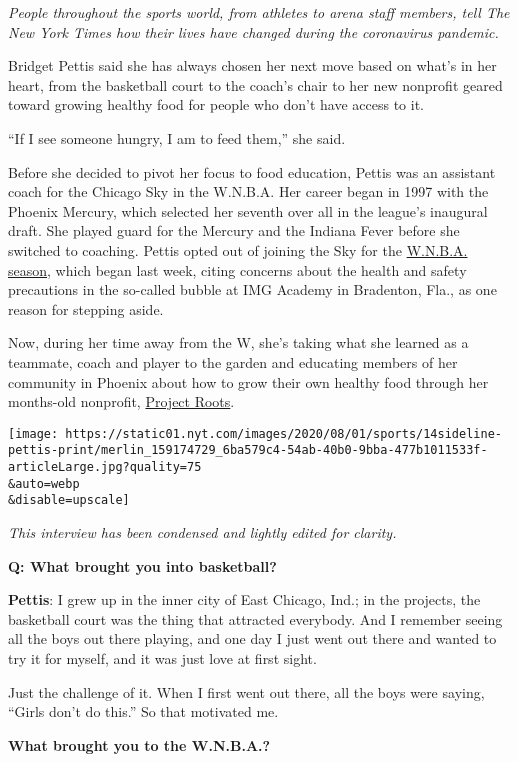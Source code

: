 \emph{People throughout the sports world, from athletes to arena staff
members, tell The New York Times how their lives have changed during the
coronavirus pandemic.}

Bridget Pettis said she has always chosen her next move based on what's
in her heart, from the basketball court to the coach's chair to her new
nonprofit geared toward growing healthy food for people who don't have
access to it.

``If I see someone hungry, I am to feed them,'' she said.

Before she decided to pivot her focus to food education, Pettis was an
assistant coach for the Chicago Sky in the W.N.B.A. Her career began in
1997 with the Phoenix Mercury, which selected her seventh over all in
the league's inaugural draft. She played guard for the Mercury and the
Indiana Fever before she switched to coaching. Pettis opted out of
joining the Sky for the
\href{https://www.nytimes.com/2020/07/23/sports/basketball/wnba-season-preview.html}{W.N.B.A.
season}, which began last week, citing concerns about the health and
safety precautions in the so-called bubble at IMG Academy in Bradenton,
Fla., as one reason for stepping aside.

Now, during her time away from the W, she's taking what she learned as a
teammate, coach and player to the garden and educating members of her
community in Phoenix about how to grow their own healthy food through
her months-old nonprofit, \href{https://www.projectrootsaz.org/}{Project
Roots}.

\texttt{[image: https://static01.nyt.com/images/2020/08/01/sports/14sideline-pettis-print/merlin\_159174729\_6ba579c4-54ab-40b0-9bba-477b1011533f-articleLarge.jpg?quality=75\\\&auto=webp\\\&disable=upscale]}

\emph{This interview has been condensed and lightly edited for clarity.}

\textbf{Q: What brought you into basketball?}

\textbf{Pettis}: I grew up in the inner city of East Chicago, Ind.; in
the projects, the basketball court was the thing that attracted
everybody. And I remember seeing all the boys out there playing, and one
day I just went out there and wanted to try it for myself, and it was
just love at first sight.

Just the challenge of it. When I first went out there, all the boys were
saying, ``Girls don't do this.'' So that motivated me.

\textbf{What brought you to the W.N.B.A.?}

